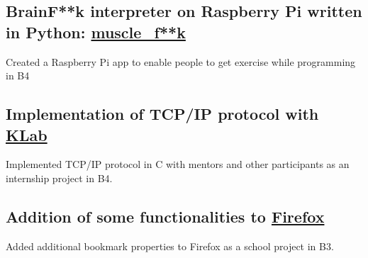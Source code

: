 \documentclass[10pt]{article}
\begin{document}
  \subsection*{BrainF**k interpreter on Raspberry Pi written in Python: \href{https://github.com/diohabara/muscle_fuck}{muscle\_f**k}}
    Created a Raspberry Pi app to enable people to get exercise while programming in B4
  \subsection*{Implementation of TCP/IP protocol with \href{https://www.klab.com/en/}{KLab}}
    Implemented TCP/IP protocol in C with mentors and other participants as an internship project in B4.
  \subsection*{Addition of some functionalities to \href{https://slides.com/diohabara/deck}{Firefox}}
    Added additional bookmark properties to Firefox as a school project in B3.
\end{document}
